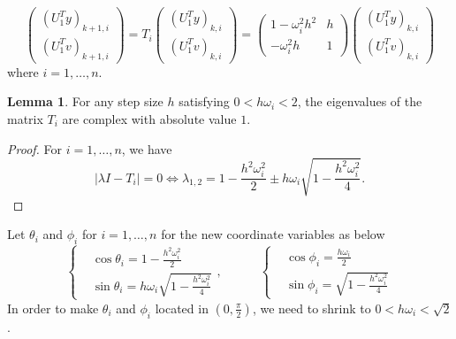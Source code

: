 \documentclass[11pt,fceqn]{article}
\numberwithin{equation}{section}
\theoremstyle{definition}
\newtheorem{lem}[thm]{Lemma}
\begin{document}
\begin{equation}
\label{eqn:equivtran}
\begin{pmatrix}
(U_{1}^{T}y)_{k+1,i} \\
(U_{1}^{T}v)_{k+1,i}
\end{pmatrix} =T_{i} \begin{pmatrix}
(U_{1}^{T}y)_{k,i} \\
(U_{1}^{T}v)_{k,i}
\end{pmatrix}= \begin{pmatrix}
                        1-\omega_{i}^{2}h^{2} & h \\
                          -\omega_{i}^{2}h        &1
                         \end{pmatrix}\begin{pmatrix}
(U_{1}^{T}y)_{k,i} \\
(U_{1}^{T}v)_{k,i}
\end{pmatrix}
\end{equation}
where $i = 1, \ldots, n$.
\begin{lem}
For any step size $h$ satisfying $0<h\omega_{i}<2$, the eigenvalues of the matrix $T_{i}$ are complex with absolute value $1$.
\end{lem}
\begin{proof} For $i = 1, \ldots, n$, we have
$$
\left|\lambda I - T_{i}\right| = 0\Leftrightarrow \lambda_{1,2} = 1-\frac{h^{2}\omega_{i}^{2}}{2} \pm h\omega_{i}\sqrt{1 - \frac{h^{2}\omega_{i}^{2}}{4}}.
$$
\end{proof}
Let $\theta_{i}$ and $\phi_{i}$ for $i = 1,\ldots,n$ for the new coordinate variables as below
\begin{equation}
\label{eqn:coortran}
\left\{\begin{aligned}
       & \cos\theta_{i} = 1-\frac{h^{2}\omega_{i}^{2}}{2} \\
       & \sin\theta_{i} = h\omega_{i}\sqrt{1 - \frac{h^{2}\omega_{i}^{2}}{4}}
       \end{aligned}\right.,\qquad\quad
\left\{\begin{aligned}
       & \cos\phi_{i} = \frac{h\omega_{i}}{2} \\
       & \sin\phi_{i} = \sqrt{1 - \frac{h^{2}\omega_{i}^{2}}{4}}
       \end{aligned}\right.
\end{equation}
In order to make $\theta_{i}$ and $\phi_{i}$ located in $\left(0, \frac{\pi}{2}\right)$, we need to shrink to $0 < h\omega_{i} < \sqrt{2}$.
\end{document}
